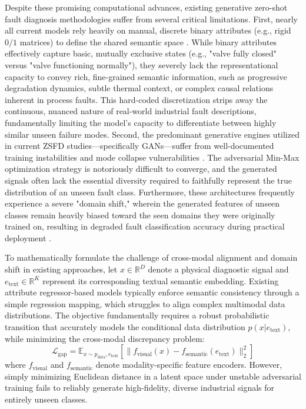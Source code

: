 Despite these promising computational advances, existing generative zero-shot fault diagnosis \cite{precup2015overview} methodologies suffer from several critical limitations. First, nearly all current models rely heavily on manual, discrete binary attributes (e.g., rigid $0/1$ matrices) to define the shared semantic space \cite{feng2021fault}. While binary attributes effectively capture basic, mutually exclusive states (e.g., "valve fully closed" versus "valve functioning normally"), they severely lack the representational capacity to convey rich, fine-grained semantic information, such as progressive degradation dynamics, subtle thermal context, or complex causal relations inherent in process faults. This hard-coded discretization strips away the continuous, nuanced nature of real-world industrial fault descriptions, fundamentally limiting the model's capacity to differentiate between highly similar unseen failure modes. Second, the predominant generative engines utilized in current ZSFD studies—specifically GANs—suffer from well-documented training instabilities and mode collapse vulnerabilities \cite{arjovsky2017wasserstein} \cite{wang2020deep}. The adversarial Min-Max optimization strategy is notoriously difficult to converge, and the generated signals often lack the essential diversity required to faithfully represent the true distribution of an unseen fault class. Furthermore, these architectures frequently experience a severe "domain shift," \cite{tzeng2017adversarial,long2015learning} wherein the generated features of unseen classes remain heavily biased toward the seen domains they were originally trained on, resulting in degraded fault classification accuracy during practical deployment \cite{wang2020deep}.

To mathematically formulate the challenge of cross-modal alignment and domain shift in existing approaches, let $x \in \mathbb{R}^D$ denote a physical diagnostic signal and $e_{\text{text}} \in \mathbb{R}^K$ represent its corresponding textual semantic embedding. Existing attribute regressor-based models typically enforce semantic consistency through a simple regression mapping, which struggles to align complex multimodal data distributions. The objective fundamentally requires a robust probabilistic transition that accurately models the conditional data distribution $p(x | e_{\text{text}})$, while minimizing the cross-modal discrepancy problem:
\begin{equation}
\label{eq:cross_modal_gap}
\mathcal{L}_{\text{gap}} = \mathbb{E}_{x \sim p_{\text{data}}, e_{\text{text}}} \left[ \| f_{\text{visual}}(x) - f_{\text{semantic}}(e_{\text{text}}) \|_2^2 \right]
\end{equation}
where $f_{\text{visual}}$ and $f_{\text{semantic}}$ denote modality-specific feature encoders. However, simply minimizing Euclidean distance in a latent space under unstable adversarial training fails to reliably generate high-fidelity, diverse industrial signals for entirely unseen classes.

